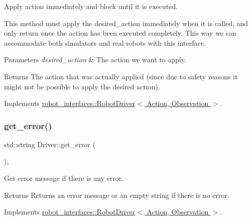Apply action immediately and block until it is executed. 

This method must apply the desired\+\_\+action immediately when it is called, and only return once the action has been executed completely. This way we can accommodate both simulators and real robots with this interface.


\begin{DoxyParams}{Parameters}
{\em desired\+\_\+action} & The action we want to apply. \\
\hline
\end{DoxyParams}
\begin{DoxyReturn}{Returns}
The action that was actually applied (since due to safety reasons it might not be possible to apply the desired action). 
\end{DoxyReturn}


Implements \hyperlink{classrobot__interfaces_1_1RobotDriver_a4294e522fcd12b38d69f7d53fae5d74a}{robot\+\_\+interfaces\+::\+Robot\+Driver$<$ Action, Observation $>$}.

\mbox{\label{classDriver_a6fb739b87c892c4102e838508855c0be}} 
\subsubsection{\texorpdfstring{get\+\_\+error()}{get\_error()}}
{\footnotesize\ttfamily std\+::string Driver\+::get\+\_\+error (\begin{DoxyParamCaption}{ }\end{DoxyParamCaption})\hspace{0.3cm}{\ttfamily [inline]}, {\ttfamily [virtual]}}



Get error message if there is any error. 

\begin{DoxyReturn}{Returns}
Returns an error message or an empty string if there is no error. 
\end{DoxyReturn}


Implements \hyperlink{classrobot__interfaces_1_1RobotDriver_acdf4c5d6993b836a180e6b6fc12b3445}{robot\+\_\+interfaces\+::\+Robot\+Driver$<$ Action, Observation $>$}.

\mbox{\label{classDriver_afb09663997bffc5c694fb5aa8aca243a}} 
